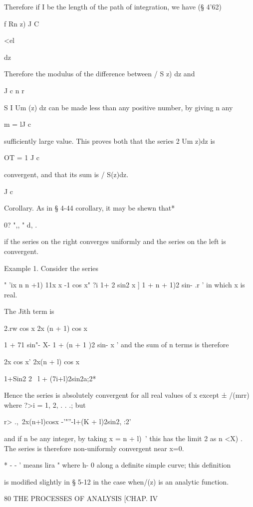 Therefore if I be the length of the path of integration, we have (§
4'62)



f Rn z) J C



<el



dz

Therefore the modulus of the difference between / S z) dz and

J c n r

S I Um (z) dz can be made less than any positive number, by giving n
any

m = lJ c

sufficiently large value. This proves both that the series 2 Um z)dz
is

OT = 1 J c

convergent, and that its sum is / S(z)dz.

J c

Corollary. As in § 4-44 corollary, it may be shewn that*

0? ",, " d, .

if the series on the right converges uniformly and the series on the
left is convergent.

Example 1. Consider the series

" 'ix n n +1) 11x x -1 cos x" ?i 1+ 2 sin2 x ] 1 + n + 1)2 sin- .r '
in which x is real.

The Jith term is

2.rw cos x 2x (n + 1) cos x



1 + 71 sin"- X- 1 + (n + 1 )2 sin- x ' and the sum of n terms is
therefore

2x cos x' 2x(n + l) cos x

1+Sin2 2~ l + (7i+l)2sin2a;2*

Hence the series is absolutely convergent for all real values of x
except ± /(mrr) where ?>i = 1, 2, . . .; but

r> .,\ 2x(n+l)cosx -'"''-l+(K + l)2sin2, :2'

and if n be any integer, by taking x = n + l)~' this has the limit 2
as n <X) . The series is therefore non-uniformly convergent near x=0.

* - - ' means lira " where h- 0 along a definite simple curve; this
definition

is modified slightly in § 5-12 in the case when/(z) is an analytic
function.



80 THE PROCESSES OF ANALYSIS [CHAP. IV

